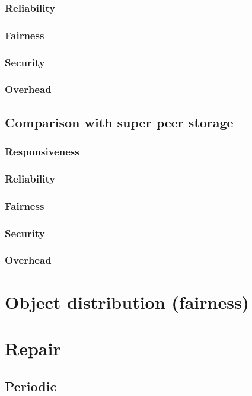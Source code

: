                 \subsubsection{Reliability}
                \subsubsection{Fairness}
                \subsubsection{Security}
                \subsubsection{Overhead}
            \subsection{Comparison with super peer storage}
                \subsubsection{Responsiveness}
                \subsubsection{Reliability}
                \subsubsection{Fairness}
                \subsubsection{Security}
                \subsubsection{Overhead}

\section{Object distribution (fairness)}

    \section{Repair}
            \subsection{Periodic}
